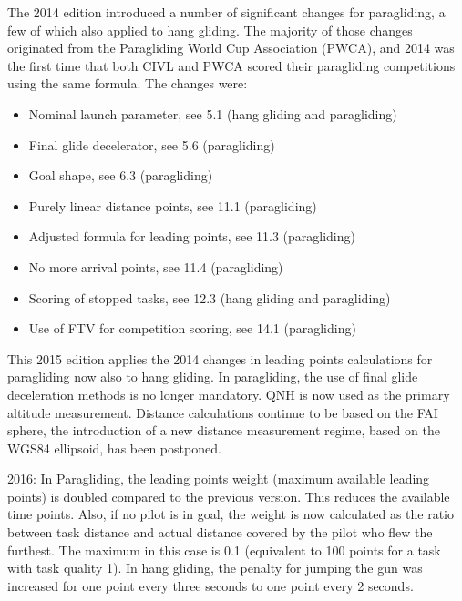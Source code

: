 \documentclass{article}
\begin{document}
The 2014 edition introduced a number of significant changes for paragliding,
a few of which also applied to hang gliding. The majority of those changes
originated from the Paragliding World Cup Association (PWCA), and 2014 was the
first time that both CIVL and PWCA scored their paragliding competitions using
the same formula. The changes were:
\begin{itemize}
    \item Nominal launch parameter, see 5.1 (hang gliding and paragliding)
    \item Final glide decelerator, see 5.6 (paragliding)
    \item Goal shape, see 6.3 (paragliding)
    \item Purely linear distance points, see 11.1 (paragliding)
    \item Adjusted formula for leading points, see 11.3 (paragliding)
    \item No more arrival points, see 11.4 (paragliding)
    \item Scoring of stopped tasks, see 12.3 (hang gliding and paragliding)
    \item Use of FTV for competition scoring, see 14.1 (paragliding)
\end{itemize}
This 2015 edition applies the 2014 changes in leading points calculations for
paragliding now also to hang gliding. In paragliding, the use of final glide
deceleration methods is no longer mandatory. QNH is now used as the primary
altitude measurement. Distance calculations continue to be based on the FAI
sphere, the introduction of a new distance measurement regime, based on the
WGS84 ellipsoid, has been postponed.

2016: In Paragliding, the leading points weight (maximum available leading
points) is doubled compared to the previous version. This reduces the available
time points. Also, if no pilot is in goal, the weight is now calculated as the
ratio between task distance and actual distance covered by the pilot who flew
the furthest. The maximum in this case is 0.1 (equivalent to 100 points for
a task with task quality 1). In hang gliding, the penalty for jumping the gun
was increased for one point every three seconds to one point every 2 seconds.
\end{document}
